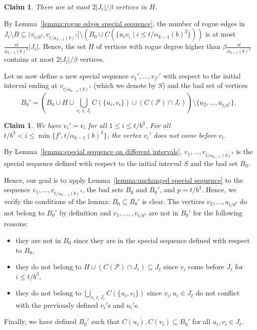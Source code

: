 \documentclass[a4paper,11pt]{article}
\makeatletter
\renewenvironment{proof}[1][\proofname] {\par\pushQED{\qed}\normalfont\topsep6\p@\@plus6\p@\relax\trivlist\item[\hskip\labelsep\bfseries#1\@addpunct{.}]\ignorespaces}{\popQED\endtrivlist\@endpefalse}
\newtheorem{claim}[theorem]{\bf Claim}
\theoremstyle{definition}
\def\cP{\mathcal{P}}
\makeatother
\begin{document}
\begin{proof}
\begin{claim}\label{claim:upper bound on H}
There are at most $2|J_\ell|/\beta$ vertices in $H$.  
\end{claim}
\begin{proof}
By Lemma~\ref{lemma:rogue edges special sequence}, the number of rogue edges in $J_\ell\setminus B\subseteq (v_{t/b^3}, v_{t/\alpha_{k-1}(b)^3}]\setminus(B_0\cup C(\{u_iv_i\mid i\leq t/\alpha_{k-1}(b)^3\}))$ is at most $\frac{st}{\alpha_{k-1}(b)^3} |J_\ell|$. 
Hence, the set $H$ of vertices with rogue degree higher than $\beta \frac{st}{\alpha_{k-1}(b)^3}$ contains at most $2|J_\ell|/\beta$ vertices.
\end{proof}

Let us now define a new special sequence $v_1', \dots, v_{f'}'$ with respect to the initial interval ending at $v_{t/\alpha_{k-1}(b)^3}$ (which we denote by $S$) and the bad set of vertices 
\[B_0'=\left(B_0\cup H\cup \bigcup_{v_i\in J_\ell} C(\{u_i, v_i\})\cup (C(\cP)\cap J_\ell)\right)\setminus \{u_2, \dots, u_{t/b^3}\}.\] 

\begin{claim}\label{claim:claim 2 in subcase 1.1}
We have $v_i'=v_i$ for all $1\leq i\leq t/b^3$. For all $t/b^3 < i\leq \min\{f', t/\alpha_{k-1}(b)^3\}$, the vertex $v_i'$ does not come before $v_i$.
\end{claim}
\begin{proof}
By Lemma~\ref{lemma:special sequence on different intervals}, $v_1, \dots, v_{t/\alpha_{k-1}(b)^3}$ is the special sequence defined with respect to the initial interval $S$ and the bad set $B_0$. 

Hence, our goal is to apply Lemma~\ref{lemma:unchanged special sequence} to the sequence $v_1, \dots, v_{t/\alpha_{k-1}(b)^3}$, the bad sets $B_0$ and $B_0'$, and $p=t/b^3$. Hence, we verify the conditions of the lemma: $B_0\subseteq B_0'$ is clear. The vertices $v_2, \dots, u_{t/b^3}$ do not belong to $B_0'$ by definition and $v_1, ..., , v_{t/b^3}$ are not in $B_0'$ for the following reasons:

\begin{itemize}
    \item they are not in $B_0$ since they are in the special sequence defined with respect to $B_0$,
    \item they do not belong to $H\cup (C(\cP)\cap J_\ell)\subseteq J_\ell$ since $v_i$ come before $J_\ell$ for $i\leq t/b^3$,
    \item they do not belong to $\bigcup_{v_i\in J_\ell} C(\{u_i, v_i\})$ since $v_i, u_i\in J_\ell$ do not conflict with the previously defined $v_i'$s and $u_i'$s.
\end{itemize}
    Finally, we have defined $B_0'$ such that $C(u_i), C(v_i)\subseteq B_0'$ for all $u_i, v_i\in J_\ell$.


\end{proof}
\end{proof}
\end{document}
